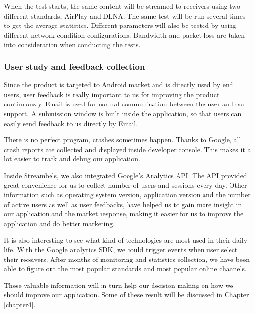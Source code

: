 When the test starts, the same content will be streamed to receivers using two different standards, AirPlay and DLNA. The same test will be run several times to get the average statistics. Different parameters will also be tested by using different network condition configurations.
Bandwidth and packet loss are taken into consideration when conducting the
tests.
\subsubsection{User study and feedback collection\label{3_7_2}}
Since the product is targeted to Android market and is directly used by end users, user feedback is really important to us for improving the product continuously. Email is used for normal communication between the user and our support. A submission window is built inside the application, so that users can easily send feedback to us directly by Email.

There is no perfect program, crashes sometimes happen. Thanks to Google, all crash reports are collected and displayed inside developer console. This makes it a lot easier to track and debug our application.

Inside Streambels, we also integrated Google's Analytics API. The API provided great convenience for us to collect number of users and sessions every day. Other information such as operating system version, application version and the number of active users as well as user feedbacks, have helped us to gain more insight in our application and the market response, making it easier for us to improve the application and do better marketing.

It is also interesting to see what kind of technologies are most used in their daily life. With the Google analytics SDK, we could trigger events when user select their receivers. After months of monitoring and statistics collection, we have been able to figure out the most popular standards and most popular online channels.

These valuable information will in turn help our decision making on how we should improve our application. Some of these result will be discussed in Chapter \ref{chapter4}.